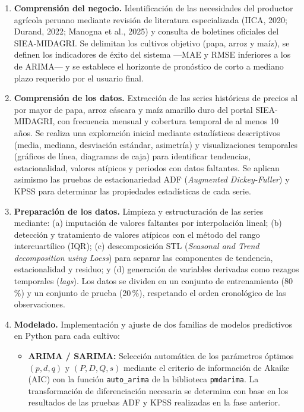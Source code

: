 \documentclass[12pt, a4paper]{report}
\begin{document}
\begin{enumerate}[label=\textbf{\arabic*.}, leftmargin=2cm]

  \item \textbf{Comprensión del negocio.}
  Identificación de las necesidades del productor agrícola peruano mediante revisión de literatura especializada (IICA, 2020; Durand, 2022; Manogna et al., 2025) y consulta de boletines oficiales del SIEA-MIDAGRI. Se delimitan los cultivos objetivo (papa, arroz y maíz), se definen los indicadores de éxito del sistema —MAE y RMSE inferiores a los de ARIMA— y se establece el horizonte de pronóstico de corto a mediano plazo requerido por el usuario final.

  \item \textbf{Comprensión de los datos.}
  Extracción de las series históricas de precios al por mayor de papa, arroz cáscara y maíz amarillo duro del portal SIEA-MIDAGRI, con frecuencia mensual y cobertura temporal de al menos 10 años. Se realiza una exploración inicial mediante estadísticos descriptivos (media, mediana, desviación estándar, asimetría) y visualizaciones temporales (gráficos de línea, diagramas de caja) para identificar tendencias, estacionalidad, valores atípicos y periodos con datos faltantes. Se aplican asimismo las pruebas de estacionariedad ADF (\textit{Augmented Dickey-Fuller}) y KPSS para determinar las propiedades estadísticas de cada serie.

  \item \textbf{Preparación de los datos.}
  Limpieza y estructuración de las series mediante: (a) imputación de valores faltantes por interpolación lineal; (b) detección y tratamiento de valores atípicos con el método del rango intercuartílico (IQR); (c) descomposición STL (\textit{Seasonal and Trend decomposition using Loess}) para separar las componentes de tendencia, estacionalidad y residuo; y (d) generación de variables derivadas como rezagos temporales (\textit{lags}). Los datos se dividen en un conjunto de entrenamiento (80\,\%) y un conjunto de prueba (20\,\%), respetando el orden cronológico de las observaciones.

  \item \textbf{Modelado.}
  Implementación y ajuste de dos familias de modelos predictivos en Python para cada cultivo:

  \begin{itemize}
    \item \textbf{ARIMA / SARIMA:} Selección automática de los parámetros óptimos $(p, d, q)$ y $(P, D, Q, s)$ mediante el criterio de información de Akaike (AIC) con la función \texttt{auto\_arima} de la biblioteca \texttt{pmdarima}. La transformación de diferenciación necesaria se determina con base en los resultados de las pruebas ADF y KPSS realizadas en la fase anterior.


\end{itemize}
\end{enumerate}
\end{document}
